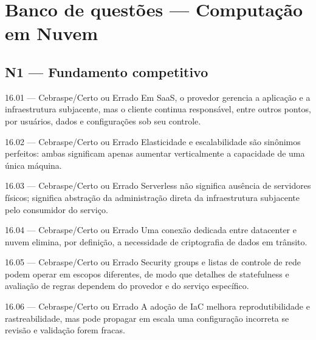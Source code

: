 \section{Banco de questões — Computação em Nuvem}

\subsection*{N1 — Fundamento competitivo}

\begin{questao}{ 16.01 — Cebraspe/Certo ou Errado}
Em SaaS, o provedor gerencia a aplicação e a infraestrutura subjacente, mas o cliente continua responsável, entre outros pontos, por usuários, dados e configurações sob seu controle.
\end{questao}

\begin{questao}{ 16.02 — Cebraspe/Certo ou Errado}
Elasticidade e escalabilidade são sinônimos perfeitos: ambas significam apenas aumentar verticalmente a capacidade de uma única máquina.
\end{questao}

\begin{questao}{ 16.03 — Cebraspe/Certo ou Errado}
Serverless não significa ausência de servidores físicos; significa abstração da administração direta da infraestrutura subjacente pelo consumidor do serviço.
\end{questao}

\begin{questao}{ 16.04 — Cebraspe/Certo ou Errado}
Uma conexão dedicada entre datacenter e nuvem elimina, por definição, a necessidade de criptografia de dados em trânsito.
\end{questao}

\begin{questao}{ 16.05 — Cebraspe/Certo ou Errado}
Security groups e listas de controle de rede podem operar em escopos diferentes, de modo que detalhes de statefulness e avaliação de regras dependem do provedor e do serviço específico.
\end{questao}

\begin{questao}{ 16.06 — Cebraspe/Certo ou Errado}
A adoção de IaC melhora reprodutibilidade e rastreabilidade, mas pode propagar em escala uma configuração incorreta se revisão e validação forem fracas.
\end{questao}


